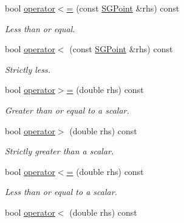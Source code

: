 \begin{DoxyCompactItemize}
\mbox{\label{classSGPoint_aaadd700e95cb45abfd79c75f08e10df9}} 
bool \hyperlink{classSGPoint_aaadd700e95cb45abfd79c75f08e10df9}{operator$<$=} (const \hyperlink{classSGPoint}{S\+G\+Point} \&rhs) const
\begin{DoxyCompactList}\small\item\em Less than or equal. \end{DoxyCompactList}\item 
\mbox{\label{classSGPoint_a6cc2f620715f7986b26983bd123bc15b}} 
bool \hyperlink{classSGPoint_a6cc2f620715f7986b26983bd123bc15b}{operator$<$} (const \hyperlink{classSGPoint}{S\+G\+Point} \&rhs) const
\begin{DoxyCompactList}\small\item\em Strictly less. \end{DoxyCompactList}\item 
\mbox{\label{classSGPoint_ac0fa5d519a52027c4529defa7a7ab917}} 
bool \hyperlink{classSGPoint_ac0fa5d519a52027c4529defa7a7ab917}{operator$>$=} (double rhs) const
\begin{DoxyCompactList}\small\item\em Greater than or equal to a scalar. \end{DoxyCompactList}\item 
\mbox{\label{classSGPoint_a458c1d4f53fe014aa3327b365f384772}} 
bool \hyperlink{classSGPoint_a458c1d4f53fe014aa3327b365f384772}{operator$>$} (double rhs) const
\begin{DoxyCompactList}\small\item\em Strictly greater than a scalar. \end{DoxyCompactList}\item 
\mbox{\label{classSGPoint_a39d9dde2c19f1f9f9088f4be2d04115b}} 
bool \hyperlink{classSGPoint_a39d9dde2c19f1f9f9088f4be2d04115b}{operator$<$=} (double rhs) const
\begin{DoxyCompactList}\small\item\em Less than or equal to a scalar. \end{DoxyCompactList}\item 
\mbox{\label{classSGPoint_aebbaa66f8e5533d424aef28cdd1a4996}} 
bool \hyperlink{classSGPoint_aebbaa66f8e5533d424aef28cdd1a4996}{operator$<$} (double rhs) const

\end{DoxyCompactItemize}
